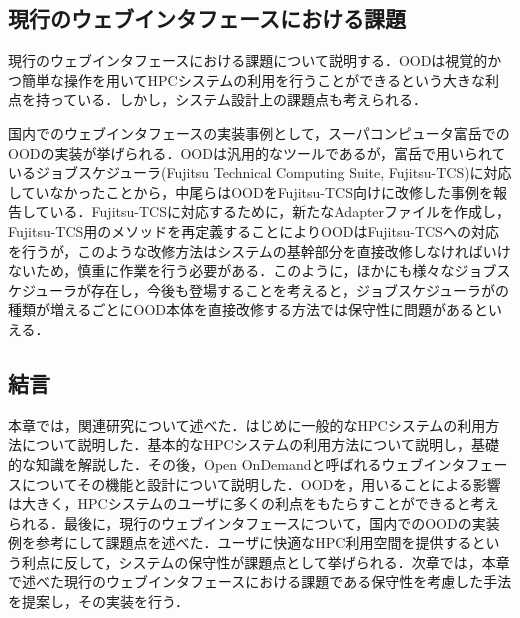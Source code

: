 \subsection{現行のウェブインタフェースにおける課題}
現行のウェブインタフェースにおける課題について説明する．OODは視覚的かつ簡単な操作を用いてHPCシステムの利用を行うことができるという大きな利点を持っている．しかし，システム設計上の課題点も考えられる．\par
国内でのウェブインタフェースの実装事例として，スーパコンピュータ富岳でのOODの実装が挙げられる．OODは汎用的なツールであるが，富岳で用いられているジョブスケジューラ(Fujitsu Technical Computing Suite, Fujitsu-TCS)に対応していなかったことから，中尾らはOODをFujitsu-TCS向けに改修した事例を報告している\cite{cite4}．Fujitsu-TCSに対応するために，新たなAdapterファイルを作成し，Fujitsu-TCS用のメソッドを再定義することによりOODはFujitsu-TCSへの対応を行うが，このような改修方法はシステムの基幹部分を直接改修しなければいけないため，慎重に作業を行う必要がある．このように，ほかにも様々なジョブスケジューラが存在し，今後も登場することを考えると，ジョブスケジューラがの種類が増えるごとにOOD本体を直接改修する方法では保守性に問題があるといえる．\par


\subsection{結言}
本章では，関連研究について述べた．はじめに一般的なHPCシステムの利用方法について説明した．基本的なHPCシステムの利用方法について説明し，基礎的な知識を解説した．その後，Open OnDemandと呼ばれるウェブインタフェースについてその機能と設計について説明した．OODを，用いることによる影響は大きく，HPCシステムのユーザに多くの利点をもたらすことができると考えられる．最後に，現行のウェブインタフェースについて，国内でのOODの実装例を参考にして課題点を述べた．ユーザに快適なHPC利用空間を提供するという利点に反して，システムの保守性が課題点として挙げられる．次章では，本章で述べた現行のウェブインタフェースにおける課題である保守性を考慮した手法を提案し，その実装を行う．\par